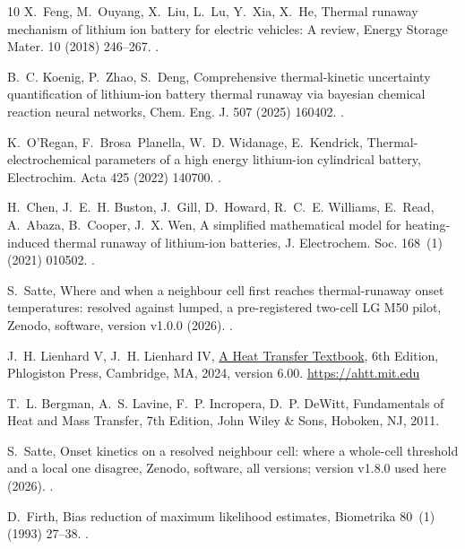 \documentclass[preprint,12pt]{elsarticle}
\begin{document}
\begin{thebibliography}{10}
X.~Feng, M.~Ouyang, X.~Liu, L.~Lu, Y.~Xia, X.~He, Thermal runaway mechanism of
  lithium ion battery for electric vehicles: A review, Energy Storage Mater. 10
  (2018) 246--267.
\newblock \href {https://doi.org/10.1016/j.ensm.2017.05.013}
  {}.

B.~C. Koenig, P.~Zhao, S.~Deng, Comprehensive thermal-kinetic uncertainty
  quantification of lithium-ion battery thermal runaway via bayesian chemical
  reaction neural networks, Chem. Eng. J. 507 (2025) 160402.
\newblock \href {https://doi.org/10.1016/j.cej.2025.160402}
  {}.

K.~O'Regan, F.~Brosa~Planella, W.~D. Widanage, E.~Kendrick,
  Thermal-electrochemical parameters of a high energy lithium-ion cylindrical
  battery, Electrochim. Acta 425 (2022) 140700.
\newblock \href {https://doi.org/10.1016/j.electacta.2022.140700}
  {}.

H.~Chen, J.~E.~H. Buston, J.~Gill, D.~Howard, R.~C.~E. Williams, E.~Read,
  A.~Abaza, B.~Cooper, J.~X. Wen, A simplified mathematical model for
  heating-induced thermal runaway of lithium-ion batteries, J. Electrochem.
  Soc. 168~(1) (2021) 010502.
\newblock \href {https://doi.org/10.1149/1945-7111/abd64c}
  {}.

S.~Satte, Where and when a neighbour cell first reaches thermal-runaway onset
  temperatures: resolved against lumped, a pre-registered two-cell {LG M50}
  pilot, Zenodo, software, version v1.0.0 (2026).
\newblock \href {https://doi.org/10.5281/zenodo.23253738}
  {}.

J.~H. {Lienhard V}, J.~H. {Lienhard IV}, \href{https://ahtt.mit.edu}{A Heat
  Transfer Textbook}, 6th Edition, Phlogiston Press, Cambridge, MA, 2024,
  version 6.00.
\newline\urlprefix\url{https://ahtt.mit.edu}

T.~L. Bergman, A.~S. Lavine, F.~P. Incropera, D.~P. DeWitt, Fundamentals of
  Heat and Mass Transfer, 7th Edition, John Wiley \& Sons, Hoboken, NJ, 2011.

S.~Satte, Onset kinetics on a resolved neighbour cell: where a whole-cell
  threshold and a local one disagree, Zenodo, software, all versions; version
  v1.8.0 used here (2026).
\newblock \href {https://doi.org/10.5281/zenodo.23279455}
  {}.

D.~Firth, Bias reduction of maximum likelihood estimates, Biometrika 80~(1)
  (1993) 27--38.
\newblock \href {https://doi.org/10.1093/biomet/80.1.27}
  {}.

\end{thebibliography}
\end{document}
